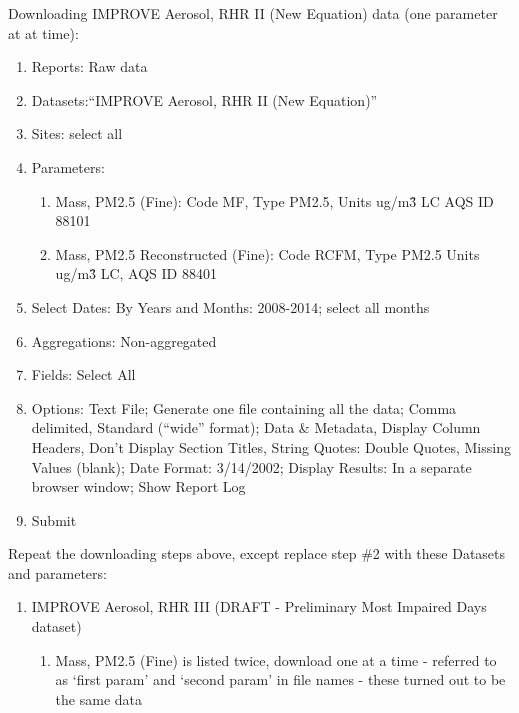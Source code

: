\noindent Downloading IMPROVE Aerosol, RHR II (New Equation) data (one parameter at at time):
\begin{enumerate}
\item Reports: Raw data
\item Datasets:``IMPROVE Aerosol, RHR II (New Equation)''
\item Sites: select all
\item Parameters: 
  \begin{enumerate}
  \item Mass, PM2.5 (Fine): Code MF, Type PM2.5, Units ug/m\^3 LC AQS ID 88101
  \item Mass, PM2.5 Reconstructed (Fine): Code RCFM, Type PM2.5 Units ug/m\^3 LC, AQS ID 88401
  \end{enumerate}
\item Select Dates: By Years and Months: 2008-2014; select all months
\item Aggregations: Non-aggregated
\item Fields: Select All
\item Options: Text File; Generate one file containing all the data; Comma delimited, Standard (``wide'' format); Data \& Metadata, Display Column Headers, Don't Display Section Titles, String Quotes: Double Quotes, Missing Values (blank); Date Format: 3/14/2002; Display Results: In a separate browser window; Show Report Log
\item Submit
\end{enumerate}

Repeat the downloading steps above, except replace step \#2 with these Datasets and parameters:
\begin{enumerate}
\item IMPROVE Aerosol, RHR III (DRAFT - Preliminary Most Impaired Days dataset) 
	\begin{enumerate}
	\item Mass, PM2.5 (Fine) is listed twice, download one at a time - referred to as `first param' and `second param' in file names - these turned out to be the same data
	\end{enumerate}
\end{enumerate}


